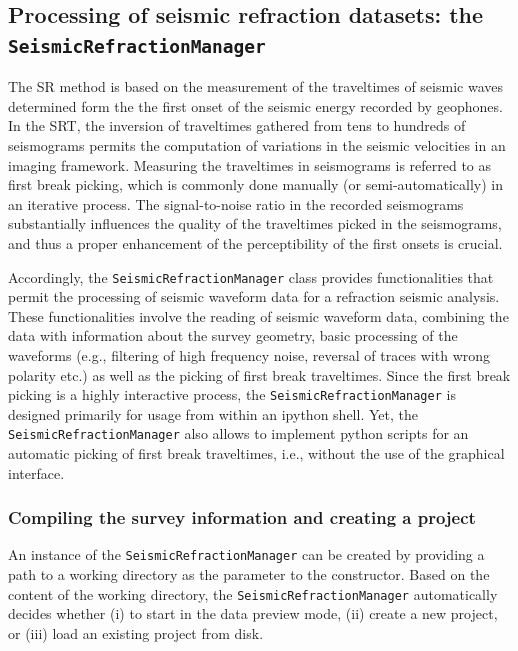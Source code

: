 \documentclass[a4paper,fleqn]{cas-sc}
\begin{document}
\subsection{Processing of seismic refraction datasets: the \texttt{SeismicRefractionManager}}

The SR method is based on the measurement of the traveltimes of seismic waves determined form the the first onset of the seismic energy recorded by geophones. In the SRT, the inversion of traveltimes gathered from tens to hundreds of seismograms permits the computation of variations in the seismic velocities in an imaging framework. Measuring the traveltimes in seismograms is referred to as first break picking, which is commonly done manually (or semi-automatically) in an iterative process. The signal-to-noise ratio in the recorded seismograms substantially influences the quality of the traveltimes picked in the seismograms, and thus a proper enhancement of the perceptibility of the first onsets is crucial.

Accordingly, the \texttt{SeismicRefractionManager} class provides functionalities that permit the processing of seismic waveform data for a refraction seismic analysis. These functionalities involve the reading of seismic waveform data, combining the data with information about the survey geometry, basic processing of the waveforms (e.g., filtering of high frequency noise, reversal of traces with wrong polarity etc.) as well as the picking of first break traveltimes. Since the first break picking is a highly interactive process, the \texttt{SeismicRefractionManager} is designed primarily for usage from within an ipython shell. Yet, the \texttt{SeismicRefractionManager} also allows to implement python scripts for an automatic picking of first break traveltimes, i.e., without the use of the graphical interface.

\subsubsection{Compiling the survey information and creating a project}

An instance of the \texttt{SeismicRefractionManager} can be created by providing a path to a working directory as the parameter to the constructor. Based on the content of the working directory, the \texttt{SeismicRefractionManager} automatically decides whether (i) to start in the data preview mode, (ii) create a new project, or (iii) load an existing project from disk.
\end{document}

